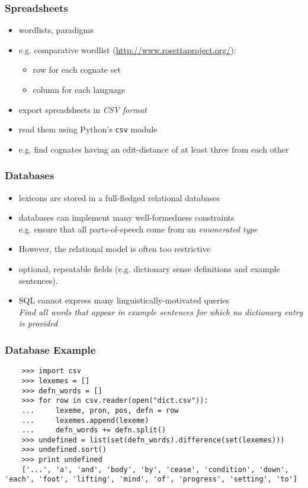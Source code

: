 \documentclass{beamer}
\begin{document}
\begin{frame}
\frametitle{Spreadsheets}
\begin{itemize}
\item wordlists, paradigms
\item e.g. comparative wordlist (\url{http://www.rosettaproject.org/}):
  \begin{itemize}
  \item row for each cognate set
  \item column for each language
  \end{itemize}
\item export spreadsheets in \textit{CSV format}
\item read them using Python's \texttt{csv} module
\item e.g. find cognates having an edit-distance of at least three from each other
\end{itemize}
\end{frame}

\begin{frame}
\frametitle{Databases}
\begin{itemize}
  \item lexicons are stored in a full-fledged relational databases
  \item databases can implement many well-formedness constraints\\
    e.g. ensure that all parts-of-speech come from an
    \textit{enumerated type}
  \item However, the relational model is often too restrictive
  \item optional, repeatable fields (e.g.
    dictionary sense definitions and example sentences).
  \item SQL cannot express many linguistically-motivated queries\\
    \textit{Find all words that appear in example sentences for which no dictionary entry is provided}
\end{itemize}
\end{frame}

\begin{frame}[fragile]
\frametitle{Database Example}  

\begin{verbatim}
    >>> import csv
    >>> lexemes = []
    >>> defn_words = []
    >>> for row in csv.reader(open("dict.csv")):
    ...     lexeme, pron, pos, defn = row
    ...     lexemes.append(lexeme)
    ...     defn_words += defn.split()
    >>> undefined = list(set(defn_words).difference(set(lexemes)))
    >>> undefined.sort()
    >>> print undefined
    ['...', 'a', 'and', 'body', 'by', 'cease', 'condition', 'down', 'each', 'foot', 'lifting', 'mind', 'of', 'progress', 'setting', 'to']
\end{verbatim}
\end{frame}
\end{document}
